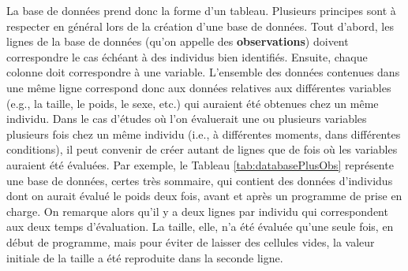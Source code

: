 \documentclass[
  french,
]{book}
\begin{document}
La base de données prend donc la forme d'un tableau. Plusieurs principes sont à respecter en général lors de la création d'une base de données. Tout d'abord, les lignes de la base de données (qu'on appelle des \textbf{observations}) doivent correspondre le cas échéant à des individus bien identifiés. Ensuite, chaque colonne doit correspondre à une variable. L'ensemble des données contenues dans une même ligne correspond donc aux données relatives aux différentes variables (e.g., la taille, le poids, le sexe, etc.) qui auraient été obtenues chez un même individu. Dans le cas d'études où l'on évaluerait une ou plusieurs variables plusieurs fois chez un même individu (i.e., à différentes moments, dans différentes conditions), il peut convenir de créer autant de lignes que de fois où les variables auraient été évaluées. Par exemple, le Tableau \ref{tab:databasePlusObs} représente une base de données, certes très sommaire, qui contient des données d'individus dont on aurait évalué le poids deux fois, avant et après un programme de prise en charge. On remarque alors qu'il y a deux lignes par individu qui correspondent aux deux temps d'évaluation. La taille, elle, n'a été évaluée qu'une seule fois, en début de programme, mais pour éviter de laisser des cellules vides, la valeur initiale de la taille a été reproduite dans la seconde ligne.

\providecommand{\docline}[3]{\noalign{\global\setlength{\arrayrulewidth}{#1}}\arrayrulecolor[HTML]{#2}\cline{#3}}

\setlength{\tabcolsep}{2pt}

\renewcommand*{\arraystretch}{1.5}
\end{document}
